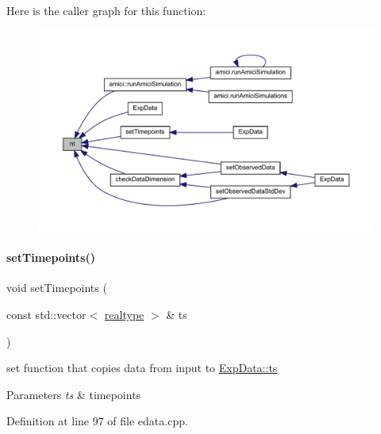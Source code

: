 Here is the caller graph for this function\+:
\nopagebreak
\begin{figure}[H]
\begin{center}
\leavevmode
\includegraphics[width=350pt]{classamici_1_1_exp_data_a7a59559fad838f7351cde47984c00ba0_icgraph}
\end{center}
\end{figure}
\mbox{\label{classamici_1_1_exp_data_a058fb6c96339b5116b1af937bc77c2e4}} 
\paragraph{\texorpdfstring{set\+Timepoints()}{setTimepoints()}}
{\footnotesize\ttfamily void set\+Timepoints (\begin{DoxyParamCaption}\item[{const std\+::vector$<$ \mbox{\hyperlink{namespaceamici_a1bdce28051d6a53868f7ccbf5f2c14a3}{realtype}} $>$ \&}]{ts }\end{DoxyParamCaption})}

set function that copies data from input to \mbox{\hyperlink{classamici_1_1_exp_data_aa7014a80e7b102f85a10e3b9a480e8e5}{Exp\+Data\+::ts}}


\begin{DoxyParams}{Parameters}
{\em ts} & timepoints \\
\hline
\end{DoxyParams}


Definition at line 97 of file edata.\+cpp.

